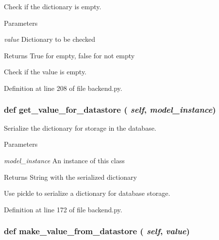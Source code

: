 Check if the dictionary is empty. 
\begin{DoxyParams}{Parameters}
\item[{\em value}]Dictionary to be checked \end{DoxyParams}
\begin{DoxyReturn}{Returns}
True for empty, false for not empty\begin{DoxyVerb}Check if the value is empty.\end{DoxyVerb}
 
\end{DoxyReturn}


Definition at line 208 of file backend.py.\hypertarget{classbackend_1_1_dict_property_a54cc138e6df3ad55c38fa5db72327963}{
\subsubsection[{get\_\-value\_\-for\_\-datastore}]{\setlength{\rightskip}{0pt plus 5cm}def get\_\-value\_\-for\_\-datastore ( {\em self}, \/   {\em model\_\-instance})}}
\label{classbackend_1_1_dict_property_a54cc138e6df3ad55c38fa5db72327963}


Serialize the dictionary for storage in the database. 
\begin{DoxyParams}{Parameters}
\item[{\em model\_\-instance}]An instance of this class \end{DoxyParams}
\begin{DoxyReturn}{Returns}
String with the serialized dictionary\begin{DoxyVerb}Use pickle to serialize a dictionary for database storage.\end{DoxyVerb}
 
\end{DoxyReturn}


Definition at line 172 of file backend.py.\hypertarget{classbackend_1_1_dict_property_a464c5a5f52df989128b5fc067ea34512}{
\subsubsection[{make\_\-value\_\-from\_\-datastore}]{\setlength{\rightskip}{0pt plus 5cm}def make\_\-value\_\-from\_\-datastore ( {\em self}, \/   {\em value})}}
\label{classbackend_1_1_dict_property_a464c5a5f52df989128b5fc067ea34512}


